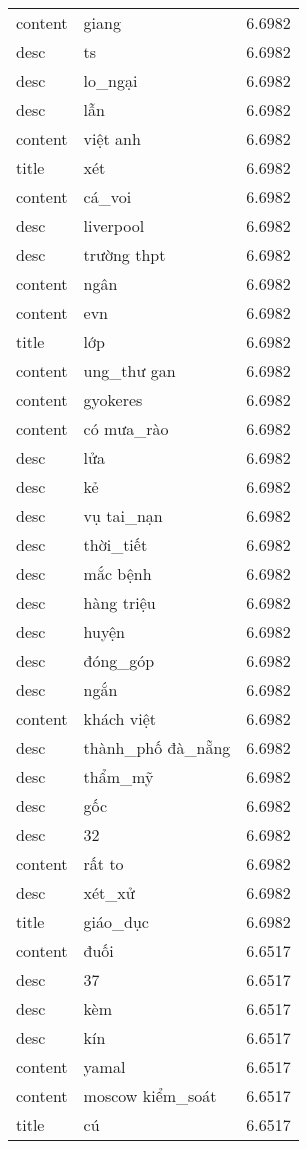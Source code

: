 \documentclass{article}
\begin{document}
\begin{tabular}{lll}
content & giang & 6.6982\\
desc & ts & 6.6982\\
desc & lo\_ngại & 6.6982\\
desc & lẫn & 6.6982\\
content & việt anh & 6.6982\\
title & xét & 6.6982\\
content & cá\_voi & 6.6982\\
desc & liverpool & 6.6982\\
desc & trường thpt & 6.6982\\
content & ngân & 6.6982\\
content & evn & 6.6982\\
title & lớp & 6.6982\\
content & ung\_thư gan & 6.6982\\
content & gyokeres & 6.6982\\
content & có mưa\_rào & 6.6982\\
desc & lửa & 6.6982\\
desc & kẻ & 6.6982\\
desc & vụ tai\_nạn & 6.6982\\
desc & thời\_tiết & 6.6982\\
desc & mắc bệnh & 6.6982\\
desc & hàng triệu & 6.6982\\
desc & huyện & 6.6982\\
desc & đóng\_góp & 6.6982\\
desc & ngắn & 6.6982\\
content & khách việt & 6.6982\\
desc & thành\_phố đà\_nẵng & 6.6982\\
desc & thẩm\_mỹ & 6.6982\\
desc & gốc & 6.6982\\
desc & 32 & 6.6982\\
content & rất to & 6.6982\\
desc & xét\_xử & 6.6982\\
title & giáo\_dục & 6.6982\\
content & đuối & 6.6517\\
desc & 37 & 6.6517\\
desc & kèm & 6.6517\\
desc & kín & 6.6517\\
content & yamal & 6.6517\\
content & moscow kiểm\_soát & 6.6517\\
title & cú & 6.6517\\

\end{tabular}
\end{document}
